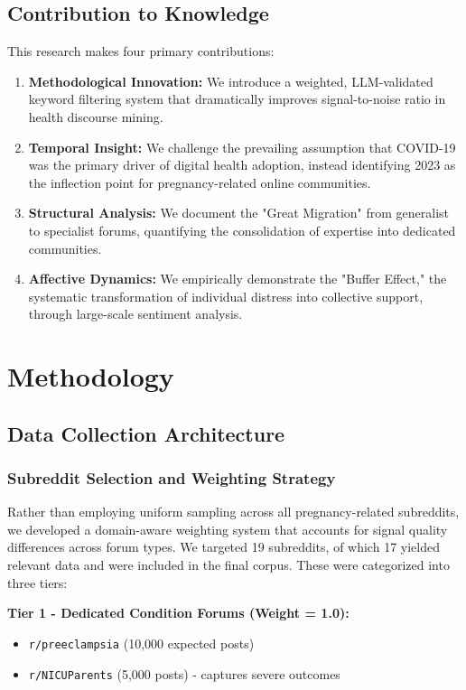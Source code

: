 \documentclass[12pt, a4paper]{article}
\begin{document}
\subsection{Contribution to Knowledge}
This research makes four primary contributions:
\begin{enumerate}
    \item \textbf{Methodological Innovation:} We introduce a weighted, LLM-validated keyword filtering system that dramatically improves signal-to-noise ratio in health discourse mining.
    \item \textbf{Temporal Insight:} We challenge the prevailing assumption that COVID-19 was the primary driver of digital health adoption, instead identifying 2023 as the inflection point for pregnancy-related online communities.
    \item \textbf{Structural Analysis:} We document the "Great Migration" from generalist to specialist forums, quantifying the consolidation of expertise into dedicated communities.
    \item \textbf{Affective Dynamics:} We empirically demonstrate the "Buffer Effect," the systematic transformation of individual distress into collective support, through large-scale sentiment analysis.
\end{enumerate}

\section{Methodology}

\subsection{Data Collection Architecture}

\subsubsection{Subreddit Selection and Weighting Strategy}
Rather than employing uniform sampling across all pregnancy-related subreddits, we developed a domain-aware weighting system that accounts for signal quality differences across forum types. We targeted 19 subreddits, of which 17 yielded relevant data and were included in the final corpus. These were categorized into three tiers:

\textbf{Tier 1 - Dedicated Condition Forums (Weight = 1.0):}
\begin{itemize}
    \item \texttt{r/preeclampsia} (10,000 expected posts)
    \item \texttt{r/NICUParents} (5,000 posts) - captures severe outcomes
\end{itemize}
\end{document}
